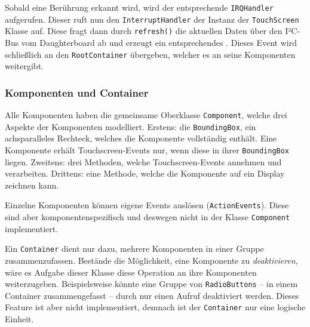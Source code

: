 		Sobald eine Berührung erkannt wird, wird der entsprechende \texttt{IRQHandler} aufgerufen.
		Dieser ruft nun den \texttt{InterruptHandler} der Instanz der \texttt{TouchScreen} Klasse auf.
		Diese fragt dann durch \texttt{refresh()} die aktuellen Daten über den I²C-Bus vom Daughterboard ab und erzeugt ein entsprechendes .
		Dieses Event wird schließlich an den \texttt{RootContainer} übergeben, welcher es an seine Komponenten weitergibt.
	
	\subsubsection{Komponenten und Container}\label{sec:components}
		\begin{figure}
			\scalebox{0.75}{
				\begin{tikzpicture}
					
				\end{tikzpicture}
			}
			\label{uml-component}
		\end{figure}
		Alle Komponenten haben die gemeinsame Oberklasse \texttt{Component}, welche drei Aspekte der Komponenten modelliert. Erstens: die \texttt{BoundingBox}, ein achsparalleles Rechteck, welches die Komponente vollständig enthält.
		Eine Komponente erhält Touchscreen-Events nur, wenn diese in ihrer \texttt{BoundingBox} liegen.
		Zweitens: drei Methoden, welche Touchscreen-Events annehmen und verarbeiten.
		Drittens: eine Methode, welche die Komponente auf ein Display zeichnen kann.
		
		Einzelne Komponenten können eigene Events auslösen (\texttt{ActionEvents}).
		Diese sind aber komponentenspezifisch und deswegen nicht in der Klasse \texttt{Component} implementiert.
		
		\medskip
		\begin{figure}
			\label{uml-container}
		\end{figure}
		Ein \texttt{Container} dient nur dazu, mehrere Komponenten in einer Gruppe zusammenzufassen.
		Bestände die Möglichkeit, eine Komponente zu \emph{deaktivieren}, wäre es Aufgabe dieser Klasse diese Operation an ihre Komponenten weiterzugeben.
		Beispielsweise könnte eine Gruppe von \texttt{RadioButtons} -- in einem Container zusammengefasst -- durch nur einen Aufruf deaktiviert werden.
		Dieses Feature ist aber nicht implementiert, demnach ist der \texttt{Container} nur eine logische Einheit.
		

